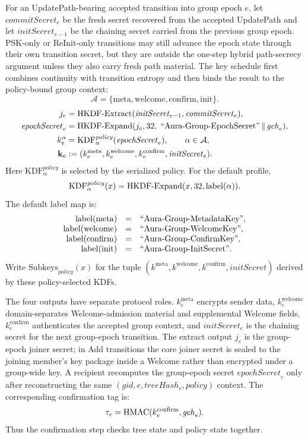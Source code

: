 \documentclass[preprint,12pt]{elsarticle}
\theoremstyle{definition}
\newcommand{\tech}[1]{\textnormal{#1}}
\newcommand{\domain}[1]{\textnormal{``#1''}}
\renewcommand{\mathsf}[1]{\mathrm{#1}}
\newcommand{\HKDF}{\tech{HKDF}}
\newcommand{\HMAC}{\tech{HMAC}}
\newcommand{\concat}{\,\|\,}
\newcommand{\gid}{\mathit{gid}}
\newcommand{\gch}{\mathit{gch}}
\newcommand{\initsec}{\mathit{initSecret}}
\newcommand{\commitsec}{\mathit{commitSecret}}
\newcommand{\epochsec}{\mathit{epochSecret}}
\newcommand{\policy}{\mathit{policy}}
\newcommand{\treehash}{\mathit{treeHash}}
\begin{document}
For an UpdatePath-bearing accepted transition into group epoch $e$, let
$\commitsec_e$ be the fresh secret recovered from the accepted UpdatePath and
let $\initsec_{e-1}$ be the chaining secret carried from the previous group
epoch. PSK-only or ReInit-only transitions may still advance the epoch state
through their own transition secret, but they are outside the one-step hybrid
path-secrecy argument unless they also carry fresh path material. The key
schedule first combines continuity with transition entropy and then binds the
result to the policy-bound group context:
\[
  \mathcal{A}=\{\mathsf{meta},\mathsf{welcome},\mathsf{confirm},\mathsf{init}\}.
\]
\begin{align}
  j_e &= \HKDF\text{-}\mathrm{Extract}(\initsec_{e-1}, \commitsec_e),\\
  \epochsec_e &=
  \HKDF\text{-}\mathrm{Expand}(j_e,32,\;
    \domain{Aura-Group-EpochSecret}\concat \gch_e),\\
  k^\alpha_e &=
  \mathsf{KDF}^{\policy}_\alpha(\epochsec_e),
  \qquad \alpha\in\mathcal{A},\\
  \mathbf{k}_e &:=
  (k^{\mathsf{meta}}_e,k^{\mathsf{welcome}}_e,
   k^{\mathsf{confirm}}_e,\initsec_e).
  \label{eq:epoch-keys}
\end{align}
Here $\mathsf{KDF}^{\policy}_\alpha$ is selected by the serialized policy.
For the default profile,
\[
  \mathsf{KDF}^{\policy}_\alpha(x)=
  \HKDF\text{-}\mathrm{Expand}(x,32,\mathsf{label}(\alpha)).
\]
The default label map is:
\[
\begin{array}{rcl}
  \mathsf{label}(\mathsf{meta}) &=& \domain{Aura-Group-MetadataKey},\\
  \mathsf{label}(\mathsf{welcome}) &=& \domain{Aura-Group-WelcomeKey},\\
  \mathsf{label}(\mathsf{confirm}) &=& \domain{Aura-Group-ConfirmKey},\\
  \mathsf{label}(\mathsf{init}) &=& \domain{Aura-Group-InitSecret}.
\end{array}
\]
Write $\mathrm{Subkeys}_{\policy}(x)$ for the tuple
$(k^{\mathsf{meta}},k^{\mathsf{welcome}},k^{\mathsf{confirm}},\initsec)$
derived by these policy-selected KDFs.

The four outputs have separate protocol roles.
$k^{\mathsf{meta}}_e$ encrypts sender data,
$k^{\mathsf{welcome}}_e$ domain-separates Welcome-admission material and
supplemental Welcome fields,
$k^{\mathsf{confirm}}_e$ authenticates the accepted group context, and
$\initsec_e$ is the chaining secret for the next group-epoch transition.
The extract output $j_e$ is the group-epoch joiner secret; in Add transitions
the core joiner secret is sealed to the joining member's key package inside a
Welcome rather than encrypted under a group-wide key. A recipient recomputes the
group-epoch secret $\epochsec_e$ only after reconstructing the same
$(\gid,e,\treehash_e,\policy)$ context.
The corresponding confirmation tag is:
\begin{equation}
  \tau_e = \HMAC(k^{\mathsf{confirm}}_e,\gch_e).
  \label{eq:confirmation}
\end{equation}
Thus the confirmation step checks tree state and policy state together.
\end{document}
